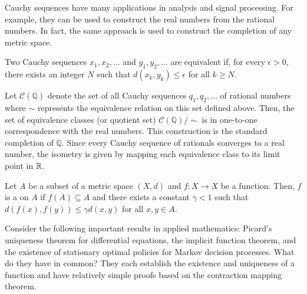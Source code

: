 Cauchy sequences have many applications in analysis and signal processing.
For example, they can be used to construct the real numbers from the rational numbers.
In fact, the same approach is used to construct the completion of any metric space.

\begin{definition}
Two Cauchy sequences $x_1, x_2, \ldots$ and $y_1, y_2, \ldots$ are equivalent if, for every $\epsilon >0$, there exists an integer $N$ such that $d (x_k, y_k) \leq \epsilon$ for all $k \geq N$.
\end{definition}

\begin{example}
Let $\mathcal{C}(\mathbb{Q})$ denote the set of all Cauchy sequences $q_1, q_2, \ldots$ of rational numbers where $\sim$ represents the equivalence relation on this set defined above.
Then, the set of equivalence classes (or quotient set) $\mathcal{C}(\mathbb{Q}) / \! \sim$ is in one-to-one correspondence with the real numbers.
This construction is the standard completion of $\mathbb{Q}$.
Since every Cauchy sequence of rationals converges to a real number, the isometry is given by mapping each equivalence class to its limit point in $\mathbb{R}$.
\end{example}

\begin{definition}
Let $A$ be a subset of a metric space $(X,d)$ and $f \colon X \rightarrow X$ be a function.
Then, $f$ is a  on $A$ if $f(A) \subseteq A$ and there exists a constant $\gamma < 1$ such that $d \left( f(x),f(y) \right) \leq \gamma  d(x,y)$ for all $x,y\in A$.
\end{definition}

Consider the following important results in applied mathematics: Picard's uniqueness theorem for differential equations, the implicit function theorem, and the existence of stationary optimal policies for Markov decision processes.
What do they have in common?
They each establish the existence and uniqueness of a function and have relatively simple proofs based on the contraction mapping theorem.

